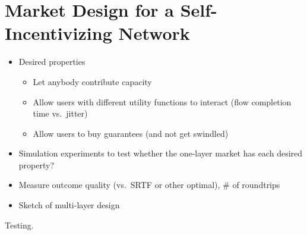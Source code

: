 \section{Market Design for a Self-Incentivizing Network}
\label{sec:designs}

\begin{itemize}

\item Desired properties

\begin{itemize}

\item Let anybody contribute capacity

\item Allow users with different utility functions to interact (flow completion time vs.~jitter)

\item Allow users to buy guarantees (and not get swindled)

\end{itemize}

\item Simulation experiments to test whether the one-layer market has each desired property?

\item Measure outcome quality (vs.~SRTF or other optimal), \# of roundtrips

\item Sketch of multi-layer design

\end{itemize}

Testing.
